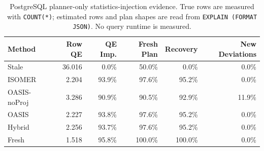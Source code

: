 \begin{table}[t]
  \centering
  \small
  \caption{PostgreSQL planner-only statistics-injection evidence. True rows are measured with \texttt{COUNT(*)}; estimated rows and plan shapes are read from \texttt{EXPLAIN (FORMAT JSON)}. No query runtime is measured.}
  \label{tab:postgres_planner_stats_injection}
  \setlength{\tabcolsep}{4pt}
  \begin{tabular}{lrrrrr}
    \toprule
    Method & Row QE & QE Imp. & Fresh Plan & Recovery & New Deviations \\
    \midrule
    Stale & 36.016 & 0.0\% & 50.0\% & 0.0\% & 0.0\% \\
    ISOMER & 2.204 & 93.9\% & 97.6\% & 95.2\% & 0.0\% \\
    OASIS-noProj & 3.286 & 90.9\% & 90.5\% & 92.9\% & 11.9\% \\
    OASIS & 2.227 & 93.8\% & 97.6\% & 95.2\% & 0.0\% \\
    Hybrid & 2.256 & 93.7\% & 97.6\% & 95.2\% & 0.0\% \\
    Fresh & 1.518 & 95.8\% & 100.0\% & 100.0\% & 0.0\% \\
    \bottomrule
  \end{tabular}
\end{table}
